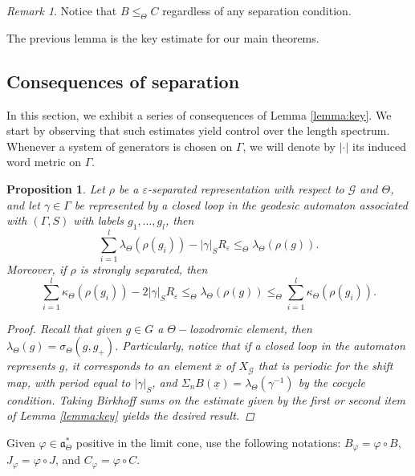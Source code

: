 \documentclass{amsart}
\newtheorem{prop}[thm]{Proposition}
\theoremstyle{remark}
\newtheorem{rmk}[thm]{Remark}
\theoremstyle{definition}
\begin{document}
\begin{rmk}
\label{rmk:upperbound}
 Notice that $B \leq_\Theta C$ regardless of any separation condition.
\end{rmk}

The previous lemma is the key estimate for our main theorems.
\subsection{Consequences of separation}

In this section, we exhibit a series of consequences of Lemma \ref{lemma:key}.
We start by observing that such estimates yield control over the length spectrum.
Whenever a system of generators is chosen on $\Gamma$, we will denote by $|\cdot|$ its induced word metric on $\Gamma$.

\begin{prop}
\label{prop:lengthcomparison}
 Let $\rho$ be a $\varepsilon$-separated representation with respect to $\mathcal{G}$ and $\Theta$, and let $\gamma \in \Gamma$ be represented by a closed loop in the geodesic automaton associated with $(\Gamma, S)$ with labels $g_1,\ldots, g_l$, then 
   $$\sum_{i=1}^l \lambda_\Theta (\rho(g_i)) - |\gamma|_S R_\varepsilon \leq_\Theta \lambda_\Theta (\rho(g)).$$
 Moreover, if $\rho$ is strongly separated, then
   $$\sum_{i=1}^l \kappa_\Theta (\rho (g_i)) - 2|\gamma|_S R_\varepsilon \leq_\Theta \lambda_\Theta (\rho (g)) \leq_\Theta \sum_{i=1}^l \kappa_\Theta (\rho (g_i)).$$
\begin{proof}
 Recall that given $g \in G$ a $\Theta-$loxodromic element, then $\lambda_\Theta (g) = \sigma_\Theta (g,g_+)$.
 Particularly, notice that if a closed loop in the automaton represents $g$, it corresponds to an element $\overline{x}$ of $X_\mathcal{G}$ that is periodic for the shift map, with period equal to $|\gamma|_S$, and $\Sigma_n B (\underline{x}) = \lambda_\Theta (\gamma^{-1})$ by the cocycle condition.
 Taking Birkhoff sums on the estimate given by the first or second item of Lemma \ref{lemma:key} yields the desired result.
   \end{proof}
\end{prop}
Given $\varphi \in \mathfrak{a}_\Theta^*$ positive in the limit cone, use the following notations: $B_\varphi = \varphi \circ B$, $J_\varphi = \varphi \circ J$, and $C_\varphi = \varphi \circ C$.
\end{document}

